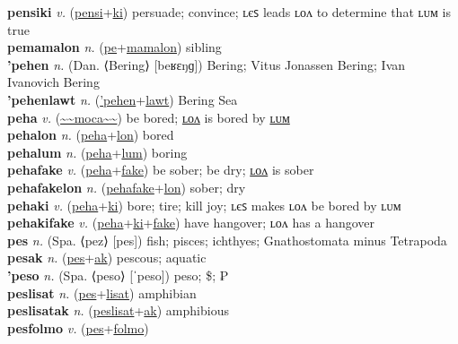 \textbf{pensiki} \textit{v.} (\hyperref[pensi]{pensi}+\hyperref[ki]{ki})
persuade; convince; ʟєꜱ leads ʟᴏᴧ to determine that ʟᴜᴍ is true \label{pensiki} \\
\textbf{pemamalon} \textit{n.} (\hyperref[pe]{pe}+\hyperref[mamalon]{mamalon})
sibling \label{pemamalon} \\
\textbf{'pehen} \textit{n.} (Dan. ⟨Bering⟩ [beʁɛŋɡ])
Bering; Vitus Jonassen Bering; Ivan Ivanovich Bering \label{'pehen} \\
\textbf{'pehenlawt} \textit{n.} (\hyperref['pehen]{'pehen}+\hyperref[lawt]{lawt})
Bering Sea \label{'pehenlawt} \\
\textbf{peha} \textit{v.} (\hyperref[moca]{\~{}\~{}moca\~{}\~{}})
be bored; \hyperref[pehalon]{ʟᴏᴧ} is bored by \hyperref[pehalum]{ʟᴜᴍ} \label{peha} \\
\textbf{pehalon} \textit{n.} (\hyperref[peha]{peha}+\hyperref[lon]{lon})
bored \label{pehalon} \\
\textbf{pehalum} \textit{n.} (\hyperref[peha]{peha}+\hyperref[lum]{lum})
boring \label{pehalum} \\
\textbf{pehafake} \textit{v.} (\hyperref[peha]{peha}+\hyperref[fake]{fake})
be sober; be dry; \hyperref[pehafakelon]{ʟᴏᴧ} is sober \label{pehafake} \\
\textbf{pehafakelon} \textit{n.} (\hyperref[pehafake]{pehafake}+\hyperref[lon]{lon})
sober; dry \label{pehafakelon} \\
\textbf{pehaki} \textit{v.} (\hyperref[peha]{peha}+\hyperref[ki]{ki})
bore; tire; kill joy; ʟєꜱ makes ʟᴏᴧ be bored by ʟᴜᴍ \label{pehaki} \\
\textbf{pehakifake} \textit{v.} (\hyperref[peha]{peha}+\hyperref[ki]{ki}+\hyperref[fake]{fake})
have hangover; ʟᴏᴧ has a hangover \label{pehakifake} \\
\textbf{pes} \textit{n.} (Spa. ⟨pez⟩ [pes])
fish; pisces; ichthyes; Gnathostomata minus Tetrapoda \label{pes} \\
\textbf{pesak} \textit{n.} (\hyperref[pes]{pes}+\hyperref[ak]{ak})
pescous; aquatic \label{pesak} \\
\textbf{'peso} \textit{n.} (Spa. ⟨peso⟩ [ˈpeso])
peso; \$; ₱ \label{'peso} \\
\textbf{peslisat} \textit{n.} (\hyperref[pes]{pes}+\hyperref[lisat]{lisat})
amphibian \label{peslisat} \\
\textbf{peslisatak} \textit{n.} (\hyperref[peslisat]{peslisat}+\hyperref[ak]{ak})
amphibious \label{peslisatak} \\
\textbf{pesfolmo} \textit{v.} (\hyperref[pes]{pes}+\hyperref[folmo]{folmo})
